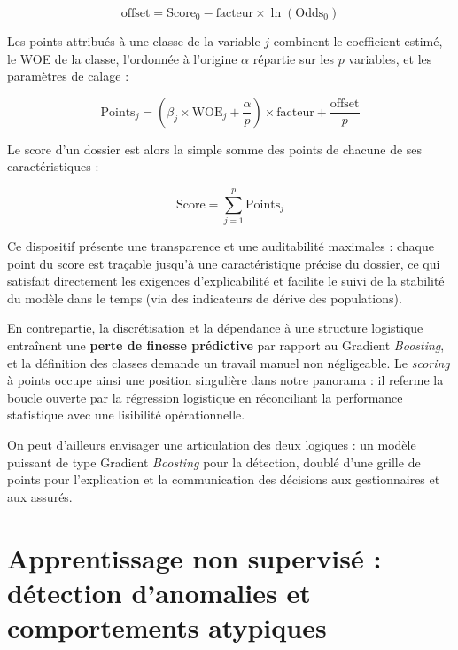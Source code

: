 \begin{equation}
    \text{offset} = \text{Score}_0 - \text{facteur} \times \ln(\text{Odds}_0)
\end{equation}

Les points attribués à une classe de la variable $j$ combinent le coefficient estimé, le WOE de la classe, l'ordonnée à l'origine $\alpha$ répartie sur les $p$ variables, et les paramètres de calage :

\begin{equation}
    \text{Points}_j = \left( \beta_j \times \text{WOE}_j + \frac{\alpha}{p} \right) \times \text{facteur} + \frac{\text{offset}}{p}
\end{equation}

Le score d'un dossier est alors la simple somme des points de chacune de ses caractéristiques :

\begin{equation}
    \text{Score} = \sum_{j=1}^{p} \text{Points}_j
\end{equation}

Ce dispositif présente une transparence et une auditabilité maximales : chaque point du score est traçable jusqu'à une caractéristique précise du dossier, ce qui satisfait directement les exigences d'explicabilité et facilite le suivi de la stabilité du modèle dans le temps (via des indicateurs de dérive des populations).

En contrepartie, la discrétisation et la dépendance à une structure logistique entraînent une \textbf{perte de finesse prédictive} par rapport au Gradient \textit{Boosting}, et la définition des classes demande un travail manuel non négligeable. Le \textit{scoring} à points occupe ainsi une position singulière dans notre panorama : il referme la boucle ouverte par la régression logistique en réconciliant la performance statistique avec une lisibilité opérationnelle.

On peut d'ailleurs envisager une articulation des deux logiques : un modèle puissant de type Gradient \textit{Boosting} pour la détection, doublé d'une grille de points pour l'explication et la communication des décisions aux gestionnaires et aux assurés.

\section{Apprentissage non supervisé : détection d'anomalies et comportements atypiques}

